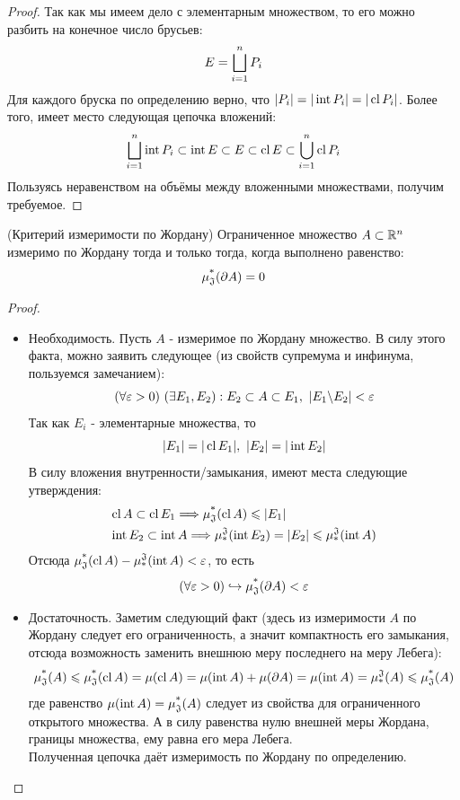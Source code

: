 \begin{proof}
	Так как мы имеем дело с элементарным множеством, то его можно разбить на конечное число брусьев:
	\[
		E = \bigsqcup_{i = 1}^n P_i
	\]
	Для каждого бруска по определению верно, что $|P_i| = |\operatorname{int} P_i| = |\operatorname{cl} P_i|$. Более того, имеет место следующая цепочка вложений:
	\[
		\bigsqcup_{i = 1}^n \operatorname{int} P_i \subset \operatorname{int} E \subset E \subset \operatorname{cl} E \subset \bigcup_{i = 1}^n \operatorname{cl} P_i
	\]
	Пользуясь неравенством на объёмы между вложенными множествами, получим требуемое.
\end{proof}

\begin{theorem} (Критерий измеримости по Жордану)
	Ограниченное множество $A \subset \mathbb{R}^n$ измеримо по Жордану тогда и только тогда, когда выполнено равенство:
	\[
		\operatorname{\mu^*_\mathfrak{J}}(\partial A) = 0
	\]
\end{theorem}

\begin{proof}
	\begin{itemize}
		\text{}
		\item Необходимость. Пусть $A$ - измеримое по Жордану множество. В силу этого факта, можно заявить следующее (из свойств супремума и инфинума, пользуемся замечанием):
		\[
			(\forall \varepsilon > 0)\ (\exists E_1, E_2) : E_2 \subset A \subset E_1,\ |E_1 \backslash E_2| < \varepsilon
		\]
		Так как $E_i$ - элементарные множества, то
		\[
			|E_1| = |\operatorname{cl} E_1|,\ |E_2| = |\operatorname{int} E_2|
		\]
		В силу вложения внутренности/замыкания, имеют места следующие утверждения:
		\begin{align*}
			&{\operatorname{cl} A \subset \operatorname{cl} E_1 \Longrightarrow \operatorname{\mu^*_\mathfrak{J}}(\operatorname{cl} A) \leqslant |E_1|}
			\\
			&{\operatorname{int} E_2 \subset \operatorname{int} A \Longrightarrow \operatorname{\mu^\mathfrak{J}_*}(\operatorname{int} E_2) = |E_2| \leqslant \operatorname{\mu^\mathfrak{J}_*}(\operatorname{int} A)}
		\end{align*}
		Отсюда $\operatorname{\mu^*_\mathfrak{J}}(\operatorname{cl} A) - \operatorname{\mu^\mathfrak{J}_*}(\operatorname{int} A) < \varepsilon$, то есть
		\[
			(\forall \varepsilon > 0)\hookrightarrow \operatorname{\mu^*_\mathfrak{J}}(\partial A) < \varepsilon
		\]
		
		\item Достаточность. Заметим следующий факт (здесь из измеримости $A$ по Жордану следует его ограниченность, а значит компактность его замыкания, отсюда возможность заменить внешнюю меру последнего на меру Лебега):
		\[
			\operatorname{\mu^*_\mathfrak{J}}(A) \leqslant \operatorname{\mu^*_\mathfrak{J}}(\operatorname{cl} A) = \mu(\operatorname{cl} A) = \mu(\operatorname{int} A) + \mu(\partial A) = \mu(\operatorname{int} A) = \operatorname{\mu^\mathfrak{J}_*}(A) \leqslant \operatorname{\mu^*_\mathfrak{J}}(A)
		\]
		где равенство $\mu(\operatorname{int} A) = \operatorname{\mu^*_\mathfrak{J}}(A)$ следует из свойства для ограниченного открытого множества. А в силу равенства нулю внешней меры Жордана, границы множества, ему равна его мера Лебега.
		\\
		Полученная цепочка даёт измеримость по Жордану по определению.
	\end{itemize}
\end{proof}

